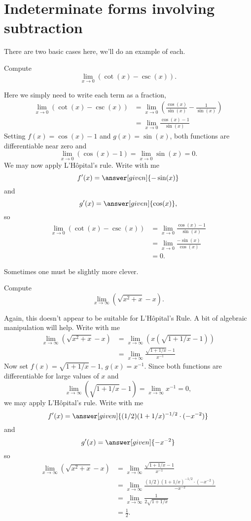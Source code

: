 \documentclass{ximera}
\begin{document}
\section{Indeterminate forms involving subtraction}

There are two basic cases here, we'll do an example of each.

\begin{example}
Compute
\[
\lim_{x\to 0} \left(\cot(x) - \csc(x)\right).
\]
\begin{explanation}
Here we simply need to write each term as a fraction,
\begin{align*}
\lim_{x\to 0} \left(\cot(x) - \csc(x)\right) &= \lim_{x\to 0} \left(\frac{\cos(x)}{\sin(x)} - \frac{1}{\sin(x)}\right)\\
&= \lim_{x\to 0} \frac{\cos(x)-1}{\sin(x)} 
\end{align*}
Setting $f(x) = \cos(x)-1$ and $g(x)=\sin(x)$, both functions are differentiable near zero and 
\[
\lim_{x\to 0}(\cos(x)-1)=\lim_{x\to 0}\sin(x) = 0.
\]
We may now apply L'H\^{o}pital's rule. Write with me
\[
f'(x) = \answer[given]{-\sin(x)}
\]
and
\[
g'(x) = \answer[given]{\cos(x)},
\]
so
\begin{align*}
  \lim_{x\to 0} \left(\cot(x) - \csc(x)\right) &= \lim_{x\to 0} \frac{\cos(x)-1}{\sin(x)}\\
  &= \lim_{x\to 0} \frac{-\sin(x)}{\cos(x)} \\
  &=0.
\end{align*}
\end{explanation}
\end{example}


Sometimes one must be slightly more clever. 

\begin{example}
Compute
\[
\lim_{x\to\infty}\left(\sqrt{x^2+x}-x\right).
\]
\begin{explanation}
Again, this doesn't appear to be suitable for L'H\^{o}pital's Rule. A
bit of algebraic manipulation will help. Write with me
\begin{align*}
\lim_{x\to\infty}\left(\sqrt{x^2+x}-x\right) &= \lim_{x\to\infty}\left(x\left(\sqrt{1+1/x}-1\right)\right)\\
&=\lim_{x\to\infty}\frac{\sqrt{1+1/x}-1}{x^{-1}}
\end{align*}
Now set $f(x) = \sqrt{1+1/x}-1$, $g(x) = x^{-1}$. Since both
  functions are differentiable for large values of $x$ and 
\[
\lim_{x\to\infty} (\sqrt{1+1/x}-1) = \lim_{x\to\infty}x^{-1} = 0, 
\]
we may apply L'H\^{o}pital's rule. Write with me
\[
f'(x) = \answer[given]{(1/2)(1+1/x)^{-1/2}\cdot(-x^{-2})}
\]
and
\[
g'(x) = \answer[given]{-x^{-2}}
\]
so
\begin{align*}
\lim_{x\to\infty}\left(\sqrt{x^2+x}-x\right) &= \lim_{x\to\infty}\frac{\sqrt{1+1/x}-1}{x^{-1}} \\
&= \lim_{x\to\infty}\frac{(1/2)(1+1/x)^{-1/2}\cdot(-x^{-2})}{-x^{-2}} \\
&= \lim_{x\to\infty} \frac{1}{2\sqrt{1+1/x}}\\
&= \frac{1}{2}.
\end{align*}
\end{explanation}
\end{example}
\end{document}
